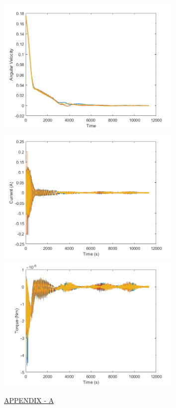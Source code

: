 \documentclass[11pt]{report}
\begin{document}
	\noindent\includegraphics[width=\linewidth,height=190pt]{./images/wVt}
	\includegraphics[width=\linewidth,height=190pt]{./images/currentVt}
	\includegraphics[width=\linewidth,height=190pt]{./images/torqVt}
	
	\pagebreak
	\hspace{120pt}\underline{\Huge APPENDIX - A}\\
	
\end{document}
